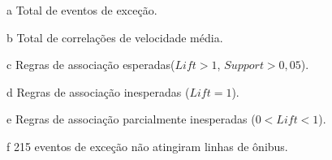 \documentclass[
	12pt,				%
	oneside,			%
	a4paper,			%
	english,			%
	brazil				%
	]{abntex2ppgsi}
\begin{document}
{{{\begin{apendicesenv}
\begin{table}[!htb]
\begin{threeparttable}
\begin{tablenotes}
            \item[a] Total de eventos de exceção.
            \item[b] Total de correlações de velocidade média.
            \item[c] Regras de associação esperadas($Lift > 1$, $Support > 0,05$).
            \item[d] Regras de associação inesperadas ($Lift = 1$).
            \item[e] Regras de associação parcialmente inesperadas ($0 < Lift < 1$).
            \item[f] 215 eventos de exceção não atingiram linhas de ônibus.
        \end{tablenotes}
\end{threeparttable}
\end{table}


\end{apendicesenv}}}}
\end{document}

